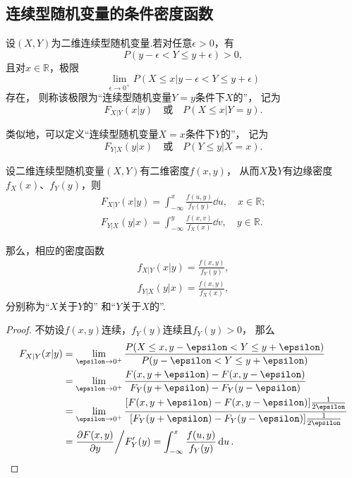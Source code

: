 \subsection{连续型随机变量的条件密度函数}
\begin{definition}
设\((X,Y)\)为二维连续型随机变量.若对任意\(\epsilon > 0\)，有\[
P(y - \epsilon < Y \leq y + \epsilon) > 0,
\]且对\(x\in\mathbb{R}\)，极限\[
\lim_{\epsilon\to0^+} P(X \leq x \vert y - \epsilon < Y \leq y + \epsilon)
\]存在，
则称该极限为“连续型随机变量\(Y=y\)条件下\(X\)的”，
记为\[
	F_{X \vert Y}(x \vert y)
	\quad\text{或}\quad
	P(X \leq x \vert Y = y).
\]

类似地，可以定义“连续型随机变量\(X=x\)条件下\(Y\)的”，
记为\[
	F_{Y \vert X}(y \vert x)
	\quad\text{或}\quad
	P(Y \leq y \vert X = x).
\]
\end{definition}

\begin{theorem}
设二维连续型随机变量\((X,Y)\)有二维密度\(f(x,y)\)，
从而\(X\)及\(Y\)有边缘密度\(f_X(x)\)、\(f_Y(y)\)，则
\begin{align*}
	F_{X \vert Y}(x \vert y)
	= \int_{-\infty}^x \frac{f(u,y)}{f_Y(y)}\dd{u}, \quad x \in \mathbb{R}; \\
	F_{Y \vert X}(y \vert x)
	= \int_{-\infty}^y \frac{f(x,v)}{f_X(x)}\dd{v}, \quad y \in \mathbb{R}.
\end{align*}

那么，相应的密度函数
\begin{gather}
	f_{X \vert Y}(x \vert y)
	= \frac{f(x,y)}{f_Y(y)},
		\label{equation:多维随机变量及其分布.条件密度、联合密度、边缘密度的关系1} \\
	f_{Y \vert X}(y \vert x)
	= \frac{f(x,y)}{f_X(x)},
		\label{equation:多维随机变量及其分布.条件密度、联合密度、边缘密度的关系2}
\end{gather}
分别称为“\(X\)关于\(Y\)的”%
和“\(Y\)关于\(X\)的”.
\begin{proof}
不妨设\(f(x,y)\)连续，\(f_Y(y)\)连续且\(f_Y(y)>0\)，
\def\l{\lim_{\epsilon\to0^+}}%
那么\begin{align*}
	F_{X \vert Y}(x \vert y)
	&= \l \frac{P(X \leq x, y - \epsilon < Y \leq y + \epsilon)}{P(y - \epsilon < Y \leq y + \epsilon)} \\
	&= \l \frac{F(x,y+\epsilon) - F(x,y-\epsilon)}{F_Y(y+\epsilon) - F_Y(y-\epsilon)} \\
	&= \l \frac{[F(x,y+\epsilon) - F(x,y-\epsilon)] \frac{1}{2 \epsilon}}{[F_Y(y+\epsilon) - F_Y(y-\epsilon)] \frac{1}{2 \epsilon}} \\
	&= \pdv{F(x,y)}{y} \bigg/ F_Y'(y)
	= \int_{-\infty}^x \frac{f(u,y)}{f_Y(y)} \dd{u}.
	\qedhere
\end{align*}
\end{proof}
\end{theorem}

